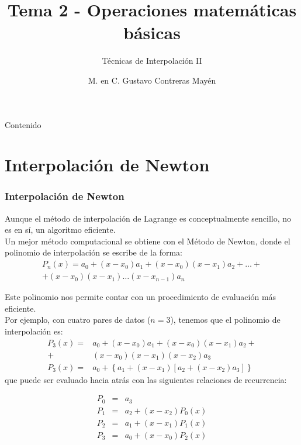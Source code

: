 

\title{Tema 2 - Operaciones matemáticas básicas}
\subtitle{Técnicas de Interpolación II}
\author[]{M. en C. Gustavo Contreras Mayén}

\maketitle
\fontsize{14}{14}\selectfont
{}
\begin{frame}{Contenido}
\tableofcontents[pausesections]
\end{frame}
\section{Interpolación de Newton}
\begin{frame}
\frametitle{Interpolación de Newton}
Aunque el método de interpolación de Lagrange es conceptualmente sencillo, no es en sí, un algoritmo eficiente.
\\
\medskip
Un mejor método computacional se obtiene con el Método de Newton, donde el polinomio de interpolación se escribe de la forma:
\[ \begin{split}
P_{n}(x) = a_{0} + (x-x_{0})a_{1} + (x-x_{0})(x-x_{1})a_{2} + \ldots + \\
+ (x-x_{0})(x-x_{1}) \ldots (x-x_{n-1})a_{n} 
\end{split} \]
\end{frame}
\begin{frame}
Este polinomio nos permite contar con un procedimiento de evaluación más eficiente.
\\
\medskip
Por ejemplo, con cuatro pares de datos ($n=3$), tenemos que el polinomio de interpolación es:
\begin{eqnarray*}
P_{3}(x) =& a_{0} + (x-x_{0}) a_{1} + (x-x_{0})(x-x_{1}) a_{2} + \\		
+& (x-x_{0})(x-x_{1})(x-x_{2})a_{3} \\
P_{3}(x) =& a_{0} + \left\lbrace a_{1}+(x-x_{1})\left[a_{2}+(x-x_{2})a_{3} \right] \right\rbrace 
\end{eqnarray*}
que puede ser evaluado hacia atrás con las siguientes relaciones de recurrencia:
\end{frame}
\begin{frame}
\begin{eqnarray*}
P_{0} &=& a_{3} \\
P_{1} &=& a_{2} + (x-x_{2})P_{0}(x) \\
P_{2} &=& a_{1} + (x-x_{1})P_{1}(x) \\
P_{3} &=& a_{0} + (x-x_{0})P_{2}(x) 
\end{eqnarray*}
\end{frame}
